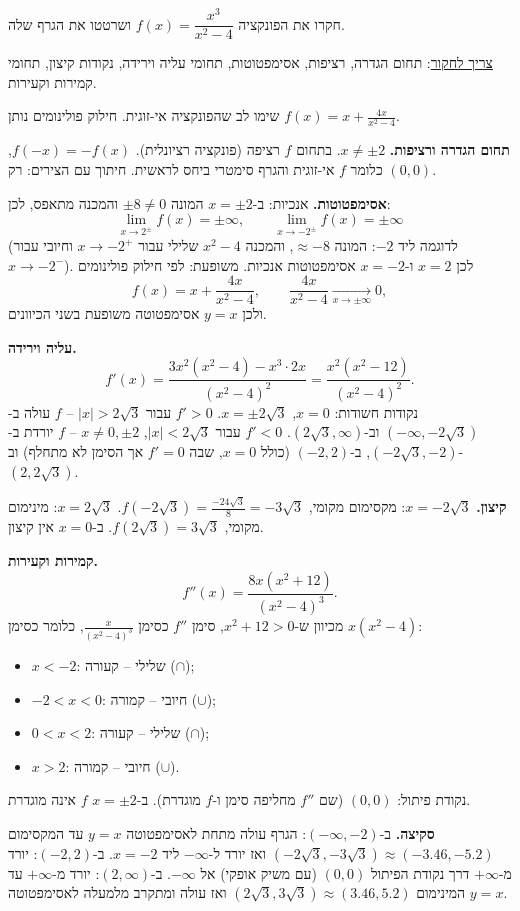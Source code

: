 
\begin{question}
חקרו את הפונקציה $f(x)=\dfrac{x^3}{x^2-4}$ ושרטטו את הגרף שלה.

\underline{צריך לחקור}: תחום הגדרה, רציפות, אסימפטוטות, תחומי עליה וירידה, נקודות קיצון, תחומי קמירות וקעירות.
\end{question}

\begin{hint}
שימו לב שהפונקציה אי-זוגית. חילוק פולינומים נותן $f(x)=x+\frac{4x}{x^2-4}$.
\end{hint}

\begin{solution}
\textbf{תחום הגדרה ורציפות.} $x\ne\pm2$. בתחום $f$ רציפה (פונקציה רציונלית). $f(-x)=-f(x)$, כלומר $f$ אי-זוגית והגרף סימטרי ביחס לראשית. חיתוך עם הצירים: רק $(0,0)$.

\textbf{אסימפטוטות.} אנכיות: ב-$x=\pm2$ המונה $\pm8\ne0$ והמכנה מתאפס, לכן:
\[ \lim_{x\to2^\pm}f(x)=\pm\infty,\qquad \lim_{x\to-2^\pm}f(x)=\pm\infty \]
(לדוגמה ליד $-2$: המונה $\approx-8$, והמכנה $x^2-4$ שלילי עבור $x\to-2^+$ וחיובי עבור $x\to-2^-$). לכן $x=2$ ו-$x=-2$ אסימפטוטות אנכיות. משופעת: לפי חילוק פולינומים
\[ f(x)=x+\frac{4x}{x^2-4},\qquad \frac{4x}{x^2-4}\xrightarrow[x\to\pm\infty]{}0, \]
ולכן $y=x$ אסימפטוטה משופעת בשני הכיוונים.

\textbf{עליה וירידה.}
\[ f'(x)=\frac{3x^2(x^2-4)-x^3\cdot2x}{(x^2-4)^2}=\frac{x^2(x^2-12)}{(x^2-4)^2}. \]
נקודות חשודות: $x=0$, $x=\pm2\sqrt3$. $f'>0$ עבור $|x|>2\sqrt3$ – $f$ עולה ב-$(-\infty,-2\sqrt3)$ וב-$(2\sqrt3,\infty)$. $f'<0$ עבור $|x|<2\sqrt3$, $x\ne0,\pm2$ – $f$ יורדת ב-$(-2\sqrt3,-2)$, ב-$(-2,2)$ (כולל $x=0$, שבה $f'=0$ אך הסימן לא מתחלף) וב-$(2,2\sqrt3)$.

\textbf{קיצון.} $x=-2\sqrt3$: מקסימום מקומי, $f(-2\sqrt3)=\frac{-24\sqrt3}{8}=-3\sqrt3$. $x=2\sqrt3$: מינימום מקומי, $f(2\sqrt3)=3\sqrt3$. ב-$x=0$ אין קיצון.

\textbf{קמירות וקעירות.}
\[ f''(x)=\frac{8x(x^2+12)}{(x^2-4)^3}. \]
מכיוון ש-$x^2+12>0$, סימן $f''$ כסימן $\frac{x}{(x^2-4)^3}$, כלומר כסימן $x(x^2-4)$:
\begin{itemize}
  \item $x<-2$: שלילי – קעורה ($\cap$);
  \item $-2<x<0$: חיובי – קמורה ($\cup$);
  \item $0<x<2$: שלילי – קעורה ($\cap$);
  \item $x>2$: חיובי – קמורה ($\cup$).
\end{itemize}
נקודת פיתול: $(0,0)$ (שם $f''$ מחליפה סימן ו-$f$ מוגדרת). ב-$x=\pm2$ $f$ אינה מוגדרת.

\textbf{סקיצה.} ב-$(-\infty,-2)$: הגרף עולה מתחת לאסימפטוטה $y=x$ עד המקסימום $(-2\sqrt3,-3\sqrt3)\approx(-3.46,-5.2)$ ואז יורד ל-$-\infty$ ליד $x=-2$. ב-$(-2,2)$: יורד מ-$+\infty$ דרך נקודת הפיתול $(0,0)$ (עם משיק אופקי) אל $-\infty$. ב-$(2,\infty)$: יורד מ-$+\infty$ עד המינימום $(2\sqrt3,3\sqrt3)\approx(3.46,5.2)$ ואז עולה ומתקרב מלמעלה לאסימפטוטה $y=x$.
\end{solution}
